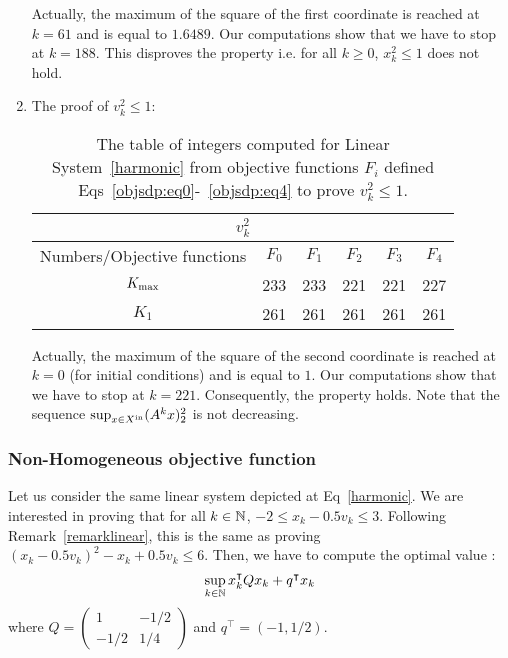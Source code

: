 \documentclass[10pt]{article}
\begin{document}
\begin{enumerate}
Actually, the maximum of the square of the first coordinate is reached at $k=61$ and is equal to $1.6489$. Our computations show that we have to stop at $k=188$. This disproves the property i.e. for all $k\geq 0$, $x_k^2\leq 1$ does not hold. 

\item The proof of $v_{k}^2\leq 1$:

\begin{table}[h!]
\begin{center}
\begin{tabular}{|c|c|c|c|c|c|}
\hline
\multicolumn{6}{|c|}{$v_k^2$}\\
\hline
Numbers/Objective functions & $F_0$ & $F_{1}$ & $F_{2}$ & $F_3$ & $F_4$ \\
\hline
$K_{\rm max}$ &233 &233 &221 & 221&227 \\
\hline
 $K_{1}$ &261 &261 &261 &261 &261 \\
\hline
\end{tabular}
\end{center}
\caption{The table of integers computed for Linear System~\eqref{harmonic} from objective functions $F_i$ defined Eqs~\eqref{objsdp:eq0}-~\eqref{objsdp:eq4} to prove $v_k^2\leq 1$.}
\end{table}

Actually, the maximum of the square of the second coordinate is reached at $k=0$ (for initial conditions) and is equal to $1$. Our computations show that we have to stop at $k=221$. Consequently, the property holds. Note that the sequence $\sup_{x\in X^\mathrm{in}} (A^k x)_2^2$ is not decreasing.
\end{enumerate}

\subsubsection{Non-Homogeneous objective function}
Let us consider the same linear system depicted at Eq~\ref{harmonic}. We are interested in proving that for all $k\in\mathbb{N}$, $-2\leq x_k-0.5v_k\leq 3$. Following Remark~\ref{remarklinear}, this is the same as proving $(x_k-0.5 v_k)^2-x_k+0.5 v_k\leq 6$. Then, we have to compute the optimal value :
\[
\sup_{k\in\mathbb{N}} x_k^\intercal Q x_k+q^\intercal x_k
\]
where $Q=\begin{pmatrix} 1 & -1/2 \\ -1/2 & 1/4\end{pmatrix}$ and $q^\intercal=(-1,1/2)$. 
\end{document}
